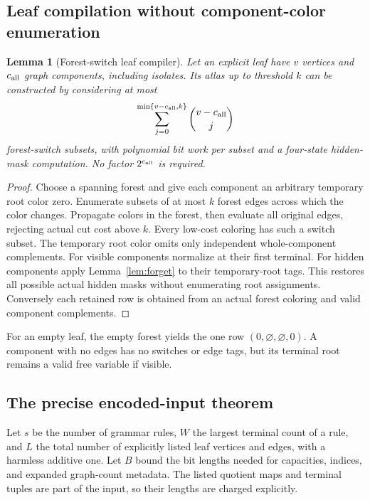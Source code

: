 \documentclass[11pt,letterpaper]{article}
\newtheorem{lemma}[theorem]{Lemma}
\theoremstyle{definition}
\theoremstyle{remark}\newtheorem{remark}[theorem]{Remark}
\newcommand{\binoms}[2]{\sum_{j=0}^{\min\{#1,#2\}}\binom{#1}{j}}
\begin{document}
\subsection{Leaf compilation without component-color enumeration}
\begin{lemma}[Forest-switch leaf compiler]\label{lem:leaf}
Let an explicit leaf have $v$ vertices and $c_{\rm all}$ graph components, including isolates. Its atlas up to threshold $k$ can be constructed by considering at most
\[
 \binoms{v-c_{\rm all}}{k}
\]
forest-switch subsets, with polynomial bit work per subset and a four-state hidden-mask computation. No factor $2^{c_{\rm all}}$ is required.
\end{lemma}
\begin{proof}
Choose a spanning forest and give each component an arbitrary temporary root color zero. Enumerate subsets of at most $k$ forest edges across which the color changes. Propagate colors in the forest, then evaluate all original edges, rejecting actual cut cost above $k$. Every low-cost coloring has such a switch subset. The temporary root color omits only independent whole-component complements. For visible components normalize at their first terminal. For hidden components apply Lemma~\ref{lem:forget} to their temporary-root tags. This restores all possible actual hidden masks without enumerating root assignments. Conversely each retained row is obtained from an actual forest coloring and valid component complements.
\end{proof}
For an empty leaf, the empty forest yields the one row $(0,\varnothing,\varnothing,0)$. A component with no edges has no switches or edge tags, but its terminal root remains a valid free variable if visible.

\subsection{The precise encoded-input theorem}
Let $s$ be the number of grammar rules, $W$ the largest terminal count of a rule, and $L$ the total number of explicitly listed leaf vertices and edges, with a harmless additive one. Let $B$ bound the bit lengths needed for capacities, indices, and expanded graph-count metadata. The listed quotient maps and terminal tuples are part of the input, so their lengths are charged explicitly.
\end{document}

